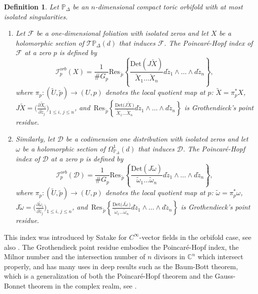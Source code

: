 \documentclass[11pt]{amsart}
\theoremstyle{plain}
\newtheorem{defi}{Definition}[section]
\theoremstyle{definition}
\begin{document}
\begin{defi} \cite{Mig, Mig2} Let $\mathbb{P}_{\Delta}$ be an $n$-dimensional compact toric orbifold with at most isolated singularities.
\begin{enumerate}
	\item Let $\mathcal{F}$ be a one-dimensional foliation with isolated zeros and let $X$ be a holomorphic section of 
$\mathcal{T}\mathbb{P}_{\Delta}(d)$ that induces $\mathcal{F}$. The Poincar\'e-Hopf index of $\mathcal{F}$ at a zero $p$ is defined by
$$\mathcal{I}_p^{orb}\left(X\right)=\frac{1}{\#G_p}\mathrm{Res}_{\,\tilde{p}}\left\{\frac{\mathrm{Det}(J\tilde{X})}
{\tilde{X}_1\dots\tilde{X}_n}d\tilde{z}_1\wedge\dots\wedge d\tilde{z}_n\right\},$$
where $\pi_p:(\widetilde{U},\tilde{p})\rightarrow(U,p)$ denotes the local quotient map at $p$:
$\tilde{X}= \pi_p^\ast X$,
$J{\tilde{X}}=\big(\frac{\partial\tilde{X}_i}{\partial\tilde{z}_j}\big)_{1\leq i,\,j\leq n}$, and 
$\,\mathrm{Res}_{\,\tilde{p}}\displaystyle\left\{\frac{\mathrm{Det}\big(J\tilde{X}\,\big)}
{\tilde{X}_1\dots\tilde{X}_n}d\tilde{z}_1\wedge\dots\wedge d\tilde{z}_n\right\}$ is Grothendieck's point residue.\\

  \item Similarly, let $\mathcal{D}$ be a codimension one distribution with isolated zeros and let $\omega$ be a holomorphic section of 
$\Omega^1_{\mathbb{P}_{\Delta}}(d)$ that induces $\mathcal{D}$. The Poincar\'e-Hopf index of $\mathcal{D}$ 
at a zero $p$ is defined by
$$\mathcal{I}_p^{orb}\left(\mathcal{D}\right)=\frac{1}{\#G_p}\mathrm{Res}_{\,\tilde{p}}\left\{\frac{\mathrm{Det}(J\tilde{\omega})}
{\tilde{\omega}_1\dots\tilde{\omega}_n}d\tilde{z}_1\wedge\dots\wedge d\tilde{z}_n\right\},$$
where $\pi_p:(\widetilde{U},\tilde{p})\rightarrow(U,p)$ denotes the local quotient map at $p$:
$\tilde{\omega}= \pi_p^\ast \omega$,
$J{\tilde{\omega}}=\big(\frac{\partial\tilde{\omega}_i}{\partial\tilde{z}_j}\big)_{1\leq i,\,j\leq n}$, and 
$\,\mathrm{Res}_{\,\tilde{p}}\displaystyle\left\{\frac{\mathrm{Det}\big(J\tilde{\omega}\,\big)}
{\tilde{\omega}_1\dots\tilde{\omega}_n}d\tilde{z}_1\wedge\dots\wedge d\tilde{z}_n\right\}$ is Grothendieck's point residue.
\end{enumerate}
\end{defi}

This index was introduced by Satake \cite{Sata} for $C^{\infty}$-vector fields in the orbifold case, see also \cite{Ding, Iza, Jou}.
The Grothendieck point residue embodies the Poincar\'e-Hopf index, the Milnor number and the intersection number of $n$ divisors in
$\mathbb{C}^n$ which intersect properly, and has many uses in deep results such as the Baum-Bott theorem, which is a
generalization of both the Poincar\'e-Hopf theorem and the Gauss-Bonnet theorem in the complex realm, see \cite{Grif, SoR, Su}. 
\end{document}

